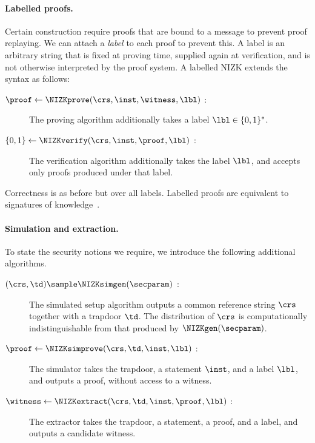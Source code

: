 \paragraph{Labelled proofs.} Certain construction require proofs that are bound
to a message to prevent proof replaying.  We can attach a \emph{label} to each
proof to prevent this.  A label is an arbitrary string that is fixed at proving
time, supplied again at verification, and is not otherwise interpreted by the
proof system.  A labelled NIZK extends the syntax as follows:

\begin{description}

  \item[$\proof \leftarrow \NIZKprove(\crs, \inst, \witness, \lbl)$ :] The
    proving algorithm additionally takes a label $\lbl \in \{0,1\}^*$.

  \item[$\{0, 1\} \leftarrow \NIZKverify(\crs, \inst, \proof, \lbl)$ :] The
    verification algorithm additionally takes the label $\lbl$, and accepts
    only proofs produced under that label.

\end{description}

Correctness is as before but over all labels.  Labelled proofs are equivalent
to signatures of knowledge~\cite{C:ChaLys06}.

\paragraph{Simulation and extraction.} To state the security notions we
require, we introduce the following additional algorithms.

\begin{description}

  \item[$(\crs, \td) \sample \NIZKsimgen(\secparam)$ :] The simulated setup
    algorithm outputs a common reference string $\crs$ together with a trapdoor
    $\td$.  The distribution of $\crs$ is computationally indistinguishable
    from that produced by $\NIZKgen(\secparam)$.

  \item[$\proof \leftarrow \NIZKsimprove(\crs, \td, \inst, \lbl)$ :] The
    simulator takes the trapdoor, a statement $\inst$, and a label $\lbl$, and
    outputs a proof, without access to a witness.

  \item[$\witness \leftarrow \NIZKextract(\crs, \td, \inst, \proof, \lbl)$ :]
    The extractor takes the trapdoor, a statement, a proof, and a label, and
    outputs a candidate witness.

\end{description}

